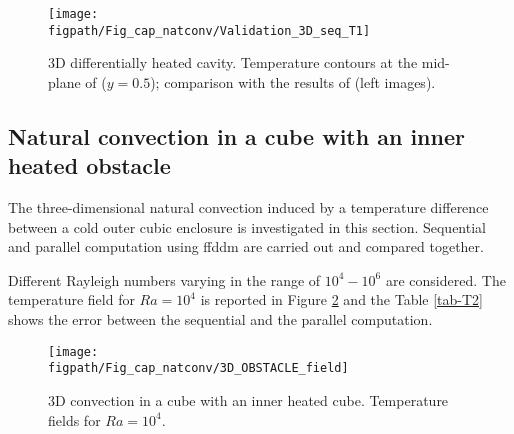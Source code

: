 \begin{figure}%
\begin{minipage}{\linewidth}
\begin{center}
 {\texttt{[image: \\figpath/Fig\_cap\_natconv/Validation\_3D\_seq\_T1]}}
\end{center}
\end{minipage}
\caption{3D differentially heated cavity. Temperature contours at the mid-plane of ($y=0.5$); comparison with the results of \cite{Wakashima-2004} (left images). }
\label{fig-3DT} 
\end{figure}

\subsection{Natural convection in a cube with an inner heated obstacle}\label{sub-OBSTACLE-3D}

The three-dimensional natural convection induced by a temperature difference between a cold outer cubic enclosure is investigated in this section.
Sequential and parallel computation using ffddm are carried out and compared together.

Different Rayleigh numbers varying in the range of $10^4 -10^6$ are considered. The temperature field for $Ra = 10^4$ is reported in Figure \ref{fig-obstacle-Ra1e4} and the Table \ref{tab-T2} shows the error between the sequential and the parallel computation.

\begin{figure}%
\begin{center}
\begin{minipage}{\linewidth}
 {\texttt{[image: \\figpath/Fig\_cap\_natconv/3D\_OBSTACLE\_field]}}
\end{minipage}
\end{center}
\caption{3D convection in a cube with an inner heated cube. Temperature fields for $Ra = 10^4$.}
\label{fig-obstacle-Ra1e4} 
\end{figure}

